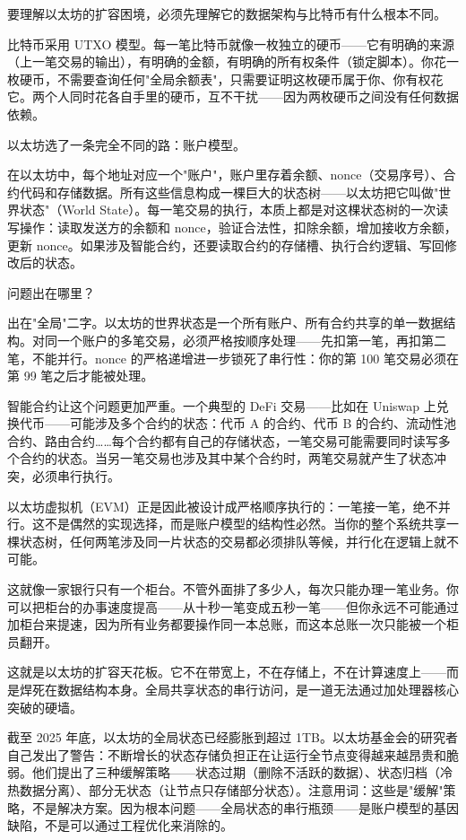 \documentclass[a4paper,12pt,openany]{ctexbook}
\begin{document}
要理解以太坊的扩容困境，必须先理解它的数据架构与比特币有什么根本不同。

比特币采用 UTXO 模型。每一笔比特币就像一枚独立的硬币——它有明确的来源（上一笔交易的输出），有明确的金额，有明确的所有权条件（锁定脚本）。你花一枚硬币，不需要查询任何"全局余额表"，只需要证明这枚硬币属于你、你有权花它。两个人同时花各自手里的硬币，互不干扰——因为两枚硬币之间没有任何数据依赖。

以太坊选了一条完全不同的路：账户模型。

在以太坊中，每个地址对应一个"账户"，账户里存着余额、nonce（交易序号）、合约代码和存储数据。所有这些信息构成一棵巨大的状态树——以太坊把它叫做"世界状态"（World State）。每一笔交易的执行，本质上都是对这棵状态树的一次读写操作：读取发送方的余额和 nonce，验证合法性，扣除余额，增加接收方余额，更新 nonce。如果涉及智能合约，还要读取合约的存储槽、执行合约逻辑、写回修改后的状态。

问题出在哪里？

出在"全局"二字。以太坊的世界状态是一个所有账户、所有合约共享的单一数据结构。对同一个账户的多笔交易，必须严格按顺序处理——先扣第一笔，再扣第二笔，不能并行。nonce 的严格递增进一步锁死了串行性：你的第 100 笔交易必须在第 99 笔之后才能被处理。

智能合约让这个问题更加严重。一个典型的 DeFi 交易——比如在 Uniswap 上兑换代币——可能涉及多个合约的状态：代币 A 的合约、代币 B 的合约、流动性池合约、路由合约……每个合约都有自己的存储状态，一笔交易可能需要同时读写多个合约的状态。当另一笔交易也涉及其中某个合约时，两笔交易就产生了状态冲突，必须串行执行。

以太坊虚拟机（EVM）正是因此被设计成严格顺序执行的：一笔接一笔，绝不并行。这不是偶然的实现选择，而是账户模型的结构性必然。当你的整个系统共享一棵状态树，任何两笔涉及同一片状态的交易都必须排队等候，并行化在逻辑上就不可能。

这就像一家银行只有一个柜台。不管外面排了多少人，每次只能办理一笔业务。你可以把柜台的办事速度提高——从十秒一笔变成五秒一笔——但你永远不可能通过加柜台来提速，因为所有业务都要操作同一本总账，而这本总账一次只能被一个柜员翻开。

这就是以太坊的扩容天花板。它不在带宽上，不在存储上，不在计算速度上——而是焊死在数据结构本身。全局共享状态的串行访问，是一道无法通过加处理器核心突破的硬墙。

截至 2025 年底，以太坊的全局状态已经膨胀到超过 1TB。以太坊基金会的研究者自己发出了警告：不断增长的状态存储负担正在让运行全节点变得越来越昂贵和脆弱。他们提出了三种缓解策略——状态过期（删除不活跃的数据）、状态归档（冷热数据分离）、部分无状态（让节点只存储部分状态）。注意用词：这些是"缓解"策略，不是解决方案。因为根本问题——全局状态的串行瓶颈——是账户模型的基因缺陷，不是可以通过工程优化来消除的。
\end{document}

